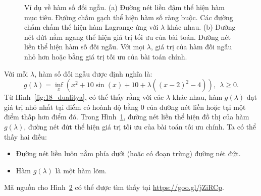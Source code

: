 \begin{figure}[t]
\begin{subfigure}{0.48\textwidth}
    \caption{}
    \label{fig:18_dualityb}
    \end{subfigure}
    \caption{Ví dụ về hàm số đối ngẫu. (a) Đường nét liền đậm thể hiện hàm mục
    tiêu. Đường chấm gạch thể hiện hàm số ràng buộc. Các đường chấm chấm
    thể hiện hàm Lagrange ứng với $\lambda$ khác nhau. (b)
    Đường nét đứt nằm ngang thể hiện giá trị tối ưu của bài toán. Đường nét liền thể
    hiện hàm số đối ngẫu. Với mọi $\lambda$, giá trị của hàm đối ngẫu nhỏ
    hơn hoặc bằng giá trị tối ưu của bài toán chính.}
    \label{fig:18_duality}
\end{figure}

Với mỗi $\lambda$, hàm số đối ngẫu được định nghĩa là: 
\begin{equation*} 
g(\lambda) = \inf_{x} \left(x^2 + 10\sin(x) + 10+ \lambda((x-2)^2 - 4) \right), ~~ \lambda \geq 0. 
\end{equation*} 
Từ Hình~\ref{fig:18_dualitya}, có thể thấy rằng với các $\lambda$ khác
nhau, hàm $g(\lambda)$ đạt giá trị nhỏ nhất tại điểm có hoành độ bằng 0 của
đường nét liền hoặc tại một điểm thấp hơn điểm đó. Trong Hình~\ref{fig:18_dualityb}, đường nét liền thể hiện đồ thị của hàm $g(\lambda)$, đường nét đứt thể hiện
giá trị tối ưu của bài toán tối ưu chính. Ta có thể thấy hai
điều:
\begin{itemize}
    \item Đường nét liền luôn nằm phía dưới (hoặc có đoạn trùng) đường nét
    đứt.
     
    \item Hàm $g(\lambda)$ là một hàm lõm.
\end{itemize}

Mã nguồn cho Hình~\ref{fig:18_duality} có thể được tìm thấy tại
\url{https://goo.gl/jZiRCp}.
 
